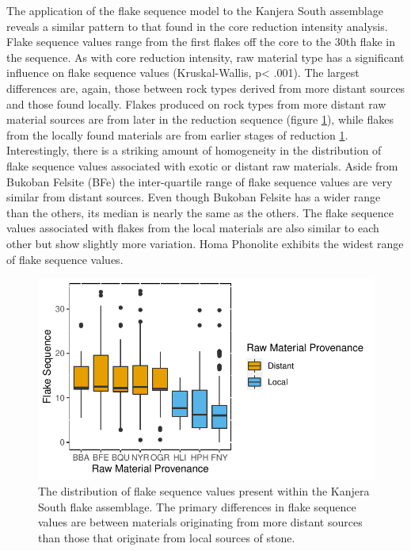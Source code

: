 \documentclass[]{elsarticle} %
\makeatletter
\def\maxwidth{\ifdim\Gin@nat@width>\linewidth\linewidth
\else\Gin@nat@width\fi}
\let\Oldincludegraphics\includegraphics
\renewcommand{\includegraphics}[1]{\Oldincludegraphics[width=\maxwidth]{#1}}
\makeatother
\begin{document}
The application of the flake sequence model to the Kanjera South
assemblage reveals a similar pattern to that found in the core reduction
intensity analysis. Flake sequence values range from the first flakes
off the core to the 30th flake in the sequence. As with core reduction
intensity, raw material type has a significant influence on flake
sequence values (Kruskal-Wallis, p\textless{} .001). The largest
differences are, again, those between rock types derived from more
distant sources and those found locally. Flakes produced on rock types
from more distant raw material sources are from later in the reduction
sequence (figure \ref{flake_seq_rm}), while flakes from the locally
found materials are from earlier stages of reduction \ref{flake_seq_rm}.
Interestingly, there is a striking amount of homogeneity in the
distribution of flake sequence values associated with exotic or distant
raw materials. Aside from Bukoban Felsite (BFe) the inter-quartile range
of flake sequence values are very similar from distant sources. Even
though Bukoban Felsite has a wider range than the others, its median is
nearly the same as the others. The flake sequence values associated with
flakes from the local materials are also similar to each other but show
slightly more variation. Homa Phonolite exhibits the widest range of
flake sequence values.

\begin{figure}
\centering
\includegraphics{Reeves_Braun_et_al_2020_Kanjera_South_JHE_files/figure-latex/fig-5-1.pdf}
\caption{The distribution of flake sequence values present within the
Kanjera South flake assemblage. The primary differences in flake
sequence values are between materials originating from more distant
sources than those that originate from local sources of stone.
\label{flake_seq_rm}}
\end{figure}
\end{document}
